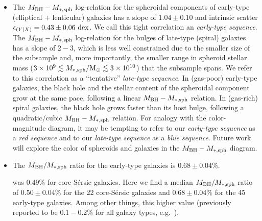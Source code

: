 \documentclass[preprint2]{emulateapj}
\begin{document}
\begin{itemize}
\item The $M_{\rm BH} - M_{\rm *,sph}$ log-relation for the spheroidal components of early-type (elliptical + lenticular) galaxies 
      has a slope of $1.04 \pm 0.10$ and intrinsic scatter $\epsilon_{(Y|X)} = 0.43 \pm 0.06\rm~dex$. 
      We call this tight correlation an \emph{early-type sequence}. 
      The $M_{\rm BH} - M_{\rm *,sph}$ log-relation for the bulges of late-type (spiral) galaxies has a slope of $2-3$,
      which is less well constrained due to
      the smaller size of the subsample and, more importantly, the smaller range in spheroid stellar mass 
      ($3 \times 10^9 \lesssim M_{\rm *,sph}/{\rm M_\odot} \lesssim 3 \times 10^{10}$) that the subsample spans. 
      We refer to this correlation as a ``tentative'' \emph{late-type sequence}. 
      In (gas-poor) early-type galaxies, the black hole and the stellar content of the spheroidal component grow at the same pace, 
      following a linear $M_{\rm BH} - M_{\rm *,sph}$ relation. 
      In (gas-rich) spiral galaxies, the black hole grows faster than its host bulge, 
      following a quadratic/cubic $M_{\rm BH} - M_{\rm *,sph}$ relation. 
      For analogy with the color-magnitude diagram, 
      it may be tempting to refer to our \emph{early-type sequence} as a \emph{red sequence} 
      and to our \emph{late-type sequence} as a \emph{blue sequence}.
      Future work will explore the color of spheroids and galaxies in the $M_{\rm BH} - M_{\rm *,sph}$ diagram.  
\item The $M_{\rm BH}/M_{\rm *,sph}$ ratio for the early-type galaxies is $0.68 \pm 0.04\%$. 
      


was 0.49\% for core-S\'ersic galaxies.   
Here we find a median $M_{\rm BH}/M_{\rm *,sph}$ ratio of $0.50 \pm 0.04\%$ for the 22 core-S\'ersic galaxies 
and $0.68 \pm 0.04\%$ for the 45 early-type galaxies.  
Among other things, this higher value (previously reported to be $0.1 - 0.2\%$ for all galaxy types, e.g.~\citealt{marconihunt2003}),  




\end{itemize}
\end{document}
